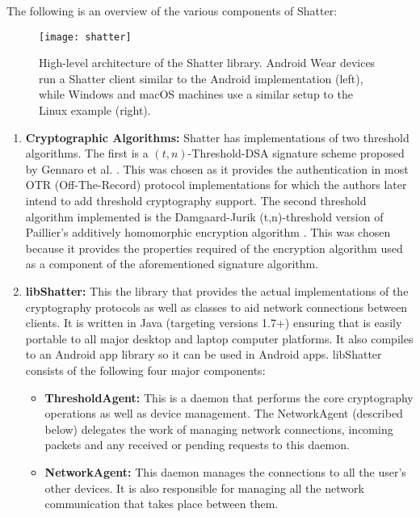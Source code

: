 The following is an overview of the various components of Shatter:

\begin{figure*}[!ht]
	\centering
	\texttt{[image: shatter]}
	\caption{
		High-level architecture of the Shatter library\cite{Atwater2016}. 
		Android Wear devices run a Shatter client similar to the Android 					
		implementation (left), while Windows and macOS machines use a similar
		setup to the Linux example (right).}
	\label{fig:shatter}
\end{figure*}

\begin{enumerate}[label=\arabic*., wide, labelwidth=!, labelindent=0pt]
	\item \textbf{Cryptographic Algorithms:} Shatter has implementations of two threshold algorithms. The first is a $(t,n)$-Threshold-DSA 						signature 	scheme proposed by Gennaro et al. \cite{Gennaro}. This was chosen as it provides the authentication in most OTR (Off-The-Record) 			protocol implementations for which the authors later intend to add threshold cryptography support. The second threshold algorithm 							implemented is the Damgaard-Jurik (t,n)-threshold version of Paillier's additively homomorphic encryption algorithm \cite{Damgard2000}. 					This was chosen because it 	provides the properties required of the encryption algorithm used as a component of the aforementioned signature 			algorithm.
	\item \textbf{libShatter:} This the library that provides the actual implementations of the cryptography protocols as well as classes to aid 					network connections between clients. It is written in Java (targeting versions 1.7+) ensuring that is easily portable to all major desktop and 				laptop computer platforms. It also compiles to an Android app library so it can be used in Android apps. libShatter consists of the following four 			major components:
	\begin{itemize}
		\item \textbf{ThresholdAgent:} This is a daemon that performs the core cryptography operations as well as device management. The 							NetworkAgent (described below) delegates the work of managing network connections, incoming packets and any received or pending 						requests to this daemon.
		\item \textbf{NetworkAgent:} This daemon manages the connections to all the user's other devices. It is also responsible for managing all the 		network communication that takes place between them.

\end{itemize}
\end{enumerate}
